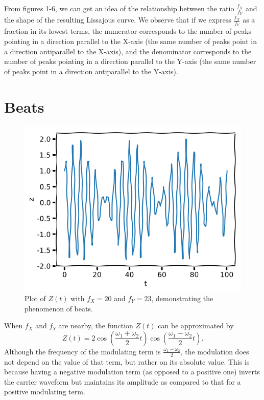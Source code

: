 \documentclass[11pt]{article}
\begin{document}
From figures 1-6, we can get an idea of the relationship between the ratio $\frac{f_X}{f_Y}$ and the shape of the resulting Lissajous curve. We observe that if we express $\frac{f_X}{f_Y}$ as a fraction in its lowest terms, the numerator corresponds to the number of peaks pointing in a direction parallel to the X-axis (the same number of peaks point in a direction antiparallel to the X-axis), and the denominator corresponds to the number of peaks pointing in a direction parallel to the Y-axis (the same number of peaks point in a direction antiparallel to the Y-axis).
\newpage

\section{Beats}
\begin{figure}[htp]
\centering
\includegraphics[scale=0.8]{beats_20_23_1_1_0_0.01_100.png}
\caption{Plot of $Z(t)$ with $f_X=20$ and $f_Y=23$, demonstrating the phenomenon of beats.}
\label{beats20_23}
\end{figure}

When $f_X$ and $f_Y$ are nearby, the function $Z(t)$ can be approximated by
\[
Z(t) = 2 \cos (\frac{\omega_1 + \omega_2}{2} t) \cos (\frac{\omega_1 - \omega_2}{2} t).
\]
Although the frequency of the modulating term is $\frac{\omega_1 - \omega_2}{2}$, the modulation does not depend on the value of that term, but rather on its absolute value. This is because having a negative modulation term (as opposed to a positive one) inverts the carrier waveform but maintains its amplitude as compared to that for a positive modulating term.
\end{document}
